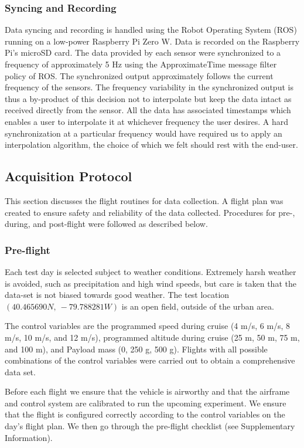 \documentclass[fleqn,10pt]{wlscirep}
\begin{document}
\subsubsection*{Syncing and Recording}

Data syncing and recording is handled using the Robot Operating System (ROS) running on a low-power Raspberry Pi Zero W. Data is recorded on the Raspberry Pi's microSD card. The data provided by each sensor were synchronized to a frequency of approximately 5 Hz using the ApproximateTime \cite{Foundation2010} message filter policy of ROS. The synchronized output approximately follows the current frequency of the sensors. The frequency variability in the synchronized output is thus a by-product of this decision not to interpolate but keep the data intact as received directly from the sensor. All the data has associated timestamps which enables a user to interpolate it at whichever frequency the user desires. A hard synchronization at a particular frequency would have required us to apply an interpolation algorithm, the choice of which we felt should rest with the end-user.

\subsection*{Acquisition Protocol}
This section discusses the flight routines for data collection. A flight plan was created to ensure safety and reliability of the data collected. Procedures for pre-, during, and post-flight were followed as described below. 
\subsubsection*{Pre-flight}

Each test day is selected subject to weather conditions. Extremely harsh weather is avoided, such as precipitation and high wind speeds, but care is taken that the data-set is not biased towards good weather. The test location $(40.465690N,~ -79.788281W)$ is an open field, outside of the urban area. 

The control variables are the programmed speed during cruise (4 m/s, 6 m/s, 8 m/s, 10 m/s, and 12 m/s), programmed altitude during cruise (25 m, 50 m, 75 m, and 100 m), and Payload mass (0, 250 g, 500 g). Flights with all possible combinations of the control variables were carried out to obtain a comprehensive data set. 

Before each flight we ensure that the vehicle is airworthy and that the airframe and control system are calibrated to run the upcoming experiment. We ensure that the flight is configured correctly according to the control variables on the day's flight plan. We then go through the pre-flight checklist (see Supplementary Information). 
\end{document}
